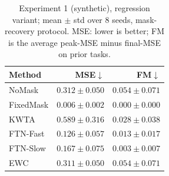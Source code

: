 \begin{table}[t]
\caption{Experiment 1 (synthetic), regression variant; mean $\pm$ std over 8 seeds, mask-recovery protocol. MSE: lower is better; FM is the average peak-MSE minus final-MSE on prior tasks.}
\label{tab:exp1reg}
\vskip 0.05in
\begin{center}\begin{small}\begin{sc}
\begin{tabular}{lrr}
\toprule
Method & MSE$\downarrow$ & FM$\downarrow$ \\
\midrule
NoMask & $0.312\pm0.050$ & $0.054\pm0.071$ \\
FixedMask & $0.006\pm0.002$ & $0.000\pm0.000$ \\
KWTA & $0.589\pm0.316$ & $0.028\pm0.038$ \\
FTN-Fast & $0.126\pm0.057$ & $0.013\pm0.017$ \\
FTN-Slow & $0.167\pm0.075$ & $0.003\pm0.007$ \\
EWC & $0.311\pm0.050$ & $0.054\pm0.071$ \\
\bottomrule
\end{tabular}
\end{sc}\end{small}\end{center}
\vskip -0.1in
\end{table}
